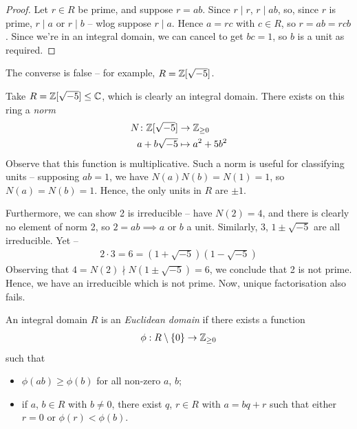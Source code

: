 \documentclass{../../template/note}
\begin{document}
    \begin{proof}
        Let $r \in R$ be prime, and suppose $r=ab$. Since $r \mid r$, $r \mid ab$, so, since $r$ is prime, $r \mid a$ or $r \mid b$ -- wlog suppose $r \mid a$. Hence $a = rc$ with $c \in R$, so $r = ab = rcb$. Since we're in an integral domain, we can cancel to get $bc = 1$, so $b$ is a unit as required.
    \end{proof}
    
    \begin{remark*}
        The converse is false -- for example, $R = \mathbb Z[\sqrt{-5}]$.
    \end{remark*}


    \begin{example*}
        Take $R = \mathbb Z[\sqrt{-5}] \leq \mathbb C$, which is clearly an integral domain. There exists on this ring a \emph{norm}
        \begin{align*}
            N\colon \mathbb Z[\sqrt{-5}] &\to \mathbb Z_{\geq 0} \\
            a + b\sqrt{-5} &\mapsto a^2 + 5b^2
        \end{align*}
        Observe that this function is multiplicative. Such a norm is useful for classifying units -- supposing $ab = 1$, we have $N(a)N(b) = N(1) = 1$, so $N(a) = N(b) = 1$. Hence, the only units in $R$ are $\pm 1$.
        
        Furthermore, we can show 2 is irreducible -- have $N(2) = 4$, and there is clearly no element of norm 2, so $2 = ab \implies a$ or $b$ a unit. Similarly, 3, $1 \pm \sqrt{-5}$ are all irreducible. Yet --
        \begin{align*}
            2 \cdot 3 = 6 = (1 + \sqrt{-5})(1 - \sqrt{-5})
        \end{align*}
        Observing that $4 = N(2) \nmid N(1 \pm \sqrt{-5}) = 6$, we conclude that 2 is not prime. Hence, we have an irreducible which is not prime. Now, unique factorisation also fails.
    \end{example*}

    \begin{definition}
        An integral domain $R$ is an \emph{Euclidean domain} if there exists a function
        \begin{align*}
            \phi: R \setminus \{0\} \to \mathbb Z_{\geq 0}
        \end{align*}
        such that
        \begin{itemize}
            \item $\phi(ab) \geq \phi(b)$ for all non-zero $a$, $b$;
            \item if $a$, $b \in R$ with $b \neq 0$, there exist $q$, $r \in R$ with $a = bq + r$ such that either $r = 0$ or $\phi(r) < \phi(b)$.
        \end{itemize}       
    \end{definition}
    
\end{document}

